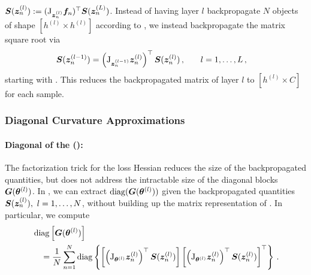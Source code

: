 ${\bm{S}}({\bm{z}}^{(l)}_n) := (\mathrm{J}_{{\bm{z}}^{(l)}_n} {\bm{f}}_n)^\top {\bm{S}}({\bm{z}}^{(L)}_n) $. Instead
of having layer $l$ backpropagate $N$ objects of shape $[h^{(l)} \times
h^{(l)}]$ according to , we instead
backpropagate the matrix square root via
\begin{align}
  {\bm{S}}({\bm{z}}^{(l-1)}_n)
  &=
    \left(\mathrm{J}_{{\bm{z}}_n^{(l-1)}} {\bm{z}}^{(l)}_n\right)^\top {\bm{S}}({\bm{z}}^{(l)}_n) \,{,}
    \qquad l = 1,\dots, L\,{,}
    \label{backpack::equ:backprop_matrix_sqrt}
\end{align}
starting with . This reduces the backpropagated matrix of layer $l$ to $[h^{(l)} \times C]$ for each sample.

\subsubsection{Diagonal Curvature Approximations}

\paragraph{Diagonal of the \GGN (\DiagGGN):} The factorization trick for the
loss Hessian reduces the size of the backpropagated quantities, but does not
address the intractable size of the \GGN diagonal blocks ${\bm{G}}({\bm{\theta}}^{(l)})$.
In \BackPACK, we can extract $\operatorname{diag}({\bm{G}}({\bm{\theta}}^{(l)}))$ given the
backpropagated quantities $\mS(\vz^{(l)}_n),\ l = 1, \dots, N$, without building
up the matrix representation of . In
particular, we compute
\begin{align}
  \begin{split}
    &\operatorname{diag}\left[{\bm{G}}({\bm{\theta}}^{(l)})\right]
    \\
    &\quad=
      \dfrac{1}{N}
      \sum_{n=1}^N
      \operatorname{diag} \left\{
      \left[
      \left(\mathrm{J}_{{\bm{\theta}}^{(l)}} {\bm{z}}^{(l)}_n\right)^\top {\bm{S}}({\bm{z}}^{(l)}_n)
      \right]
      \left[
      \left(\mathrm{J}_{{\bm{\theta}}^{(l)}} {\bm{z}}^{(l)}_n\right)^\top {\bm{S}}({\bm{z}}^{(l)}_n)
      \right]^\top\right\}\,{.}
  \end{split}\label{backpack::equ:block_diag_ggn}
\end{align}

